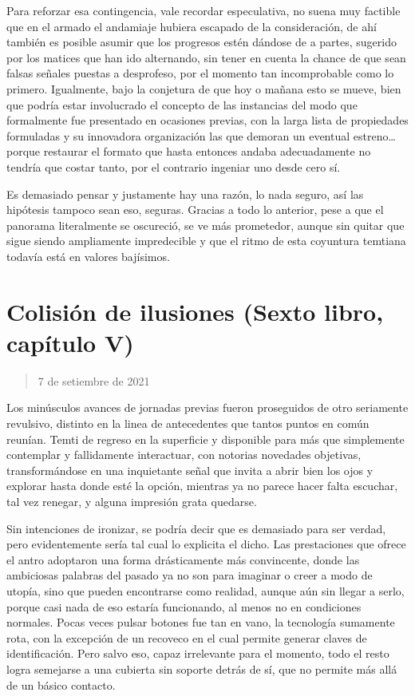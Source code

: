 \documentclass[
]{book}
\begin{document}
Para reforzar esa contingencia, vale recordar especulativa, no suena muy factible que en el armado el andamiaje hubiera escapado de la consideración, de ahí también es posible asumir que los progresos estén dándose de a partes, sugerido por los matices que han ido alternando, sin tener en cuenta la chance de que sean falsas señales puestas a desprofeso, por el momento tan incomprobable como lo primero. Igualmente, bajo la conjetura de que hoy o mañana esto se mueve, bien que podría estar involucrado el concepto de las instancias del modo que formalmente fue presentado en ocasiones previas, con la larga lista de propiedades formuladas y su innovadora organización las que demoran un eventual estreno\ldots{} porque restaurar el formato que hasta entonces andaba adecuadamente no tendría que costar tanto, por el contrario ingeniar uno desde cero sí.

Es demasiado pensar y justamente hay una razón, lo nada seguro, así las hipótesis tampoco sean eso, seguras. Gracias a todo lo anterior, pese a que el panorama literalmente se oscureció, se ve más prometedor, aunque sin quitar que sigue siendo ampliamente impredecible y que el ritmo de esta coyuntura temtiana todavía está en valores bajísimos.

\hypertarget{colisiuxf3n-de-ilusiones-sexto-libro-capuxedtulo-v}{%
\section{Colisión de ilusiones (Sexto libro, capítulo V)}\label{colisiuxf3n-de-ilusiones-sexto-libro-capuxedtulo-v}}

\begin{quote}
7 de setiembre de 2021
\end{quote}

Los minúsculos avances de jornadas previas fueron proseguidos de otro seriamente revulsivo, distinto en la linea de antecedentes que tantos puntos en común reunían. Temti de regreso en la superficie y disponible para más que simplemente contemplar y fallidamente interactuar, con notorias novedades objetivas, transformándose en una inquietante señal que invita a abrir bien los ojos y explorar hasta donde esté la opción, mientras ya no parece hacer falta escuchar, tal vez renegar, y alguna impresión grata quedarse.

Sin intenciones de ironizar, se podría decir que es demasiado para ser verdad, pero evidentemente sería tal cual lo explicita el dicho. Las prestaciones que ofrece el antro adoptaron una forma drásticamente más convincente, donde las ambiciosas palabras del pasado ya no son para imaginar o creer a modo de utopía, sino que pueden encontrarse como realidad, aunque aún sin llegar a serlo, porque casi nada de eso estaría funcionando, al menos no en condiciones normales. Pocas veces pulsar botones fue tan en vano, la tecnología sumamente rota, con la excepción de un recoveco en el cual permite generar claves de identificación. Pero salvo eso, capaz irrelevante para el momento, todo el resto logra semejarse a una cubierta sin soporte detrás de sí, que no permite más allá de un básico contacto.
\end{document}
